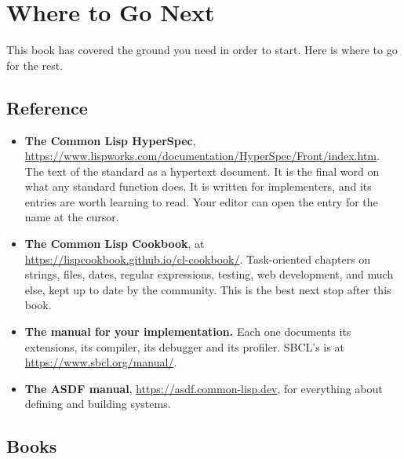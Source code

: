 \chapter{Where to Go Next}

This book has covered the ground you need in order to start. Here is
where to go for the rest.

\section{Reference}

\begin{itemize}
\item \textbf{The Common Lisp HyperSpec},
\url{https://www.lispworks.com/documentation/HyperSpec/Front/index.htm}. The
text of the standard as a hypertext document. It is the final word on
what any standard function does. It is written for implementers, and
its entries are worth learning to read. Your editor can open the
entry for the name at the cursor.

\item \textbf{The Common Lisp Cookbook}, at\\
\url{https://lispcookbook.github.io/cl-cookbook/}. Task-oriented
chapters on strings, files, dates, regular expressions, testing, web
development, and much else, kept up to date by the community. This is
the best next stop after this book.

\item \textbf{The manual for your implementation.} Each one documents
its extensions, its compiler, its debugger and its profiler. SBCL's
is at \url{https://www.sbcl.org/manual/}.

\item \textbf{The ASDF manual}, \url{https://asdf.common-lisp.dev},
for everything about defining and building systems.
\end{itemize}

\section{Books}


